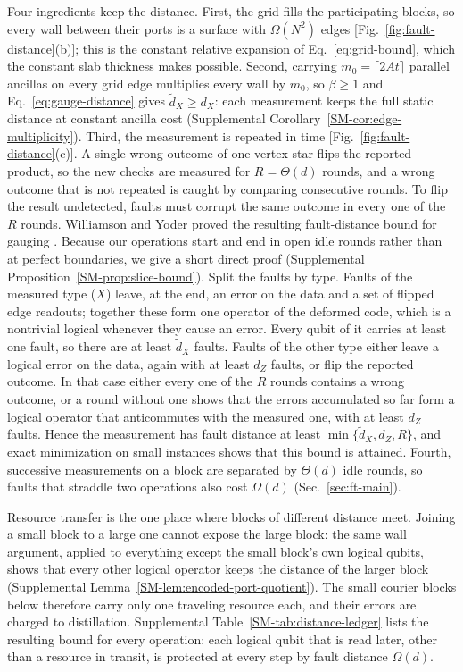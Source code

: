 Four ingredients keep the distance.  First, the grid fills the
participating blocks, so every wall between their ports is a surface with
$\Omega(N^2)$ edges [Fig.~\ref{fig:fault-distance}(b)]; this is the constant
relative expansion of Eq.~\eqref{eq:grid-bound}, which the constant slab
thickness makes possible.  Second, carrying $m_0=\lceil2At\rceil$ parallel
ancillas on every grid edge multiplies every wall by $m_0$, so $\beta\ge1$
and Eq.~\eqref{eq:gauge-distance} gives $\widetilde d_X\ge d_X$: each
measurement keeps the full static distance at constant ancilla cost
(Supplemental Corollary~\ref{SM-cor:edge-multiplicity}).  Third, the
measurement is repeated in time [Fig.~\ref{fig:fault-distance}(c)].  A single
wrong outcome of one vertex star flips the reported product, so the new
checks are measured for $R=\Theta(d)$ rounds, and a wrong outcome that is
not repeated is caught by comparing consecutive rounds.  To flip the result
undetected, faults must corrupt the same outcome in every one of the $R$
rounds.  Williamson and Yoder proved the resulting fault-distance bound for
gauging \cite{WilliamsonYoderGauging}.  Because our operations start and end
in open idle rounds rather than at perfect boundaries, we give a short direct
proof (Supplemental Proposition~\ref{SM-prop:slice-bound}).  Split the faults
by type.  Faults of the measured type ($X$) leave, at the end, an error on
the data and a set of flipped edge readouts; together these form one
operator of the deformed code, which is a nontrivial logical whenever they
cause an error.  Every qubit of it carries at least one fault, so there are
at least $\widetilde d_X$ faults.  Faults of the other
type either leave a logical error on the data, again with at least $d_Z$
faults, or flip the reported outcome.  In that case either every one of the
$R$ rounds contains a wrong outcome, or a round without one shows that the
errors accumulated so far form a logical operator that anticommutes with the
measured one, with at least $d_Z$ faults.  Hence the measurement has fault
distance at least $\min\{\widetilde d_X,d_Z,R\}$, and exact minimization on
small instances shows that this bound is attained.  Fourth,
successive measurements on a block are separated by $\Theta(d)$ idle rounds,
so faults that straddle two operations also cost $\Omega(d)$
(Sec.~\ref{sec:ft-main}).

Resource transfer is the one place where blocks of different distance meet.
Joining a small block to a large one cannot expose the large block: the same
wall argument, applied to everything except the small block's own logical
qubits, shows that every other logical operator keeps the distance of the
larger block (Supplemental
Lemma~\ref{SM-lem:encoded-port-quotient}). The small courier blocks below
therefore carry only one traveling resource each, and their errors are
charged to distillation. Supplemental Table~\ref{SM-tab:distance-ledger}
lists the resulting bound for every operation: each logical qubit that is
read later, other than a resource in transit, is protected at every step by
fault distance $\Omega(d)$.


